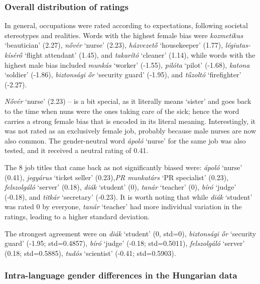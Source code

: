 \documentclass[11pt]{article}
\begin{document}
\subsubsection{Overall distribution of ratings}

In general, occupations were rated according to expectations, following societal stereotypes and realities. Words with the highest female bias were \textit{kozmetikus} `beautician' (2.27), \textit{nővér} `nurse' (2.23), \textit{házvezető} `housekeeper' (1.77), \textit{légiutas-kísérő} `flight attendant' (1.45), and \textit{takarító} `cleaner' (1.14), while words with the highest male bias included \textit{munkás} `worker' (-1.55), \textit{pilóta} `pilot' (-1.68), \textit{katona} `soldier' (-1.86), \textit{biztonsági őr} `security guard' (-1.95), and \textit{tűzoltó} `firefighter' (-2.27).

\textit{Nővér} `nurse' (2.23) -- is a bit special, as it literally means `sister' and goes back to the time when nuns were the ones taking care of the sick; hence the word carries a strong female bias that is encoded in its literal meaning. Interestingly, it was not rated as an exclusively female job, probably because male nurses are now also common. The gender-neutral word \textit{ápoló} `nurse' for the same job was also tested, and it received a neutral rating of 0.41.

The 8 job titles that came back as not significantly biased were: \textit{ápoló} `nurse' (0.41), \textit{jegyárus} `ticket seller' (0.23),\textit{PR munkatárs} `PR specialist' (0.23), \textit{felszolgáló} `server' (0.18),  \textit{diák} `student' (0), \textit{tanár} `teacher' (0), \textit{bíró} `judge' (-0.18), and \textit{titkár} `secretary' (-0.23). It is worth noting that while \textit{diák} `student' was rated 0 by everyone, \textit{tanár} `teacher' had more individual variation in the ratings, leading to a higher standard deviation.

The strongest agreement were on \textit{diák} `student' (0, std=0), \textit{biztonsági őr} `security guard' (-1.95; std=0.4857), \textit{bíró} `judge' (-0.18; std=0.5011), \textit{felszolgáló} `server' (0.18; std=0.5885), \textit{tudós} `scientist' (-0.41; std=0.5903).




\subsubsection{Intra-language gender differences in the Hungarian data}
\end{document}
